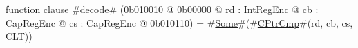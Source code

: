 function clause #\hyperref[sailMIPSzdecode]{decode}# (0b010010 @ 0b00000 @ rd : IntRegEnc @ cb : CapRegEnc @ cs : CapRegEnc @ 0b010110) = #\hyperref[sailMIPSzSome]{Some}#(#\hyperref[sailMIPSzCPtrCmp]{CPtrCmp}#(rd, cb, cs, CLT))
